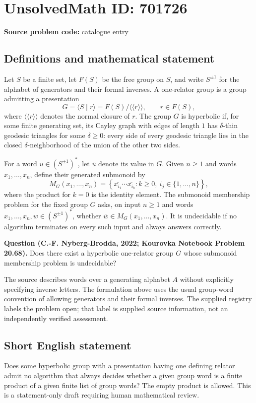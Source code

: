 \documentclass[11pt]{article}
\begin{document}
\section*{UnsolvedMath ID: 701726}
\textbf{Source problem code:} catalogue entry
\subsection{Definitions and mathematical statement}
Let \(S\) be a finite set, let \(F(S)\) be the free group on \(S\), and write \(S^{\pm1}\) for the alphabet of generators and their formal inverses. A one-relator group is a group admitting a presentation
\[
G=\langle S\mid r\rangle=F(S)/\langle\!\langle r\rangle\!\rangle,
\qquad r\in F(S),
\]
where \(\langle\!\langle r\rangle\!\rangle\) denotes the normal closure of \(r\). The group \(G\) is hyperbolic if, for some finite generating set, its Cayley graph with edges of length \(1\) has \(\delta\)-thin geodesic triangles for some \(\delta\geq0\): every side of every geodesic triangle lies in the closed \(\delta\)-neighborhood of the union of the other two sides.

For a word \(u\in(S^{\pm1})^*\), let \(\overline{u}\) denote its value in \(G\). Given \(n\geq1\) and words \(x_1,\ldots,x_n\), define their generated submonoid by
\[
M_G(x_1,\ldots,x_n)
=\left\{\overline{x_{i_1}}\cdots\overline{x_{i_k}}:
 k\geq0,\ i_j\in\{1,\ldots,n\}\right\},
\]
where the product for \(k=0\) is the identity element. The submonoid membership problem for the fixed group \(G\) asks, on input \(n\geq1\) and words \(x_1,\ldots,x_n,w\in(S^{\pm1})^*\), whether \(\overline{w}\in M_G(x_1,\ldots,x_n)\). It is undecidable if no algorithm terminates on every such input and always answers correctly.

\textbf{Question (C.-F. Nyberg-Brodda, 2022; Kourovka Notebook Problem 20.68).} Does there exist a hyperbolic one-relator group \(G\) whose submonoid membership problem is undecidable?

The source describes words over a generating alphabet \(A\) without explicitly specifying inverse letters. The formulation above uses the usual group-word convention of allowing generators and their formal inverses. The supplied registry labels the problem open; that label is supplied source information, not an independently verified assessment.
\subsection{Short English statement}
Does some hyperbolic group with a presentation having one defining relator admit no algorithm that always decides whether a given group word is a finite product of a given finite list of group words? The empty product is allowed. This is a statement-only draft requiring human mathematical review.
\end{document}
